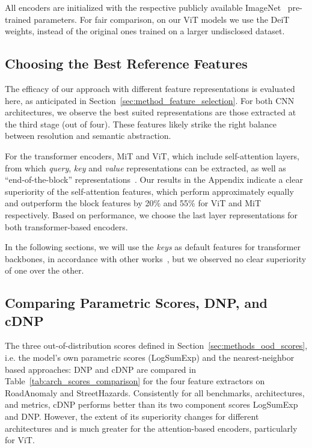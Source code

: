 \documentclass[10pt,twocolumn,letterpaper]{article}
\begin{document}
All encoders are initialized with the respective publicly available ImageNet~\cite{deng2009imagenet} pre-trained parameters. For fair comparison, on our ViT models we use the DeiT~\cite{deit} weights, instead of the original ones trained on a larger undisclosed dataset.

\subsection{Choosing the Best Reference Features}
\label{sec:ablation_fts}

The efficacy of our approach with different feature representations is evaluated here, as anticipated in Section~\ref{sec:method_feature_selection}.
For both CNN architectures, we observe the best suited representations are those extracted at the third stage (out of four). These features likely strike the right balance between resolution and semantic abstraction.

For the transformer encoders, MiT and ViT, which include self-attention layers, from which \textit{query}, \textit{key} and \textit{value} representations can be extracted, as well as ``end-of-the-block'' representations~\cite{NIPS2017_3f5ee243}.
Our results in the Appendix indicate a clear superiority of the self-attention features, which perform approximately equally and outperform the block features by 20\% and 55\% for ViT and MiT respectively. Based on performance, we choose the last layer representations for both transformer-based encoders.

In the following sections, we will use the \textit{keys} as default features for transformer backbones, in accordance with other works~\cite{LOST}, but we observed no clear superiority of one over the other.

\subsection{Comparing Parametric Scores, DNP, and cDNP}
\label{sec:baseline}
The three out-of-distribution scores defined in Section~\ref{sec:methods_ood_scores}, i.e. the model's own parametric scores (LogSumExp) and the nearest-neighbor based approaches: DNP and cDNP are compared in Table~\ref{tab:arch_scores_comparison} for the four feature extractors on RoadAnomaly and StreetHazards.
Consistently for all benchmarks, architectures, and metrics, cDNP performs better than its two component scores LogSumExp and DNP. However, the extent of its superiority changes for different architectures and is much greater for the attention-based encoders,  particularly for ViT. 
\end{document}
